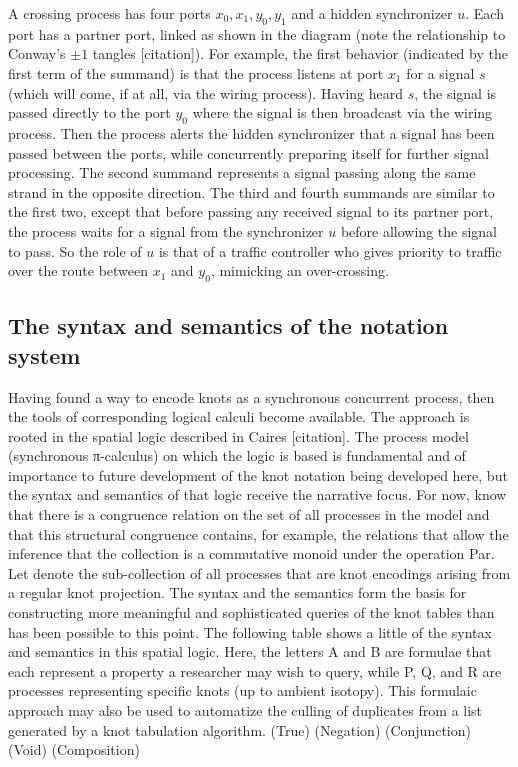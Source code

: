 \documentclass[12pt]{amsart}
\begin{document}
 A crossing process has four ports $x_0,x_1,y_0,y_1$   and a hidden synchronizer $u$. Each port has a partner port, linked as shown in the diagram (note the relationship to Conway's $\pm 1$ tangles [citation]). For example, the first behavior (indicated by the first term of the summand) is that the process listens at port $x_1$   for a signal $s$  (which will come, if at all, via the wiring process). Having heard $s$, the signal is passed directly to the port $y_0$  where the signal is then broadcast via the wiring process. Then the process alerts the hidden synchronizer  that a signal has been passed between the ports, while concurrently preparing itself for further signal processing. The second summand represents a signal passing along the same strand in the opposite direction. The third and fourth summands are similar to the first two, except that before passing any received signal to its partner port, the process waits for a signal from the synchronizer $u$ before allowing the signal to pass. So the role of $u$ is that of a traffic controller who gives priority to traffic over the route between $x_1$ and $y_0$, mimicking an over-crossing.            

\subsection{The syntax and semantics of the notation system}\label{sub:the_syntax_and_semantics_of_the_notation_system} %

Having found a way to encode knots as a synchronous concurrent process, then the tools of corresponding logical calculi become available. The approach is rooted in the spatial logic described in Caires [citation]. The process model (synchronous π-calculus) on which the logic is based is fundamental and of importance to future development of the knot notation being developed here, but the syntax and semantics of that logic receive the narrative focus. For now, know that there is a congruence relation   on the set of all processes in the model and that this structural congruence contains, for example, the relations that allow the inference that the collection is a commutative monoid under the operation Par. Let   denote the sub-collection of all processes that are knot encodings arising from a regular knot projection. The syntax and the semantics form the basis for constructing more meaningful and sophisticated queries of the knot tables than has been possible to this point. The following table shows a little of the syntax and semantics in this spatial logic. Here, the letters A and B are formulae that each represent a property a researcher may wish to query, while P, Q, and R are processes representing specific knots (up to ambient isotopy). This formulaic approach may also be used to automatize the culling of duplicates from a list generated by a knot tabulation algorithm.
 	(True)	 	 
 	(Negation)	 	 
 	(Conjunction)	 	 
 	(Void)	 	 
 	(Composition)
\end{document}
